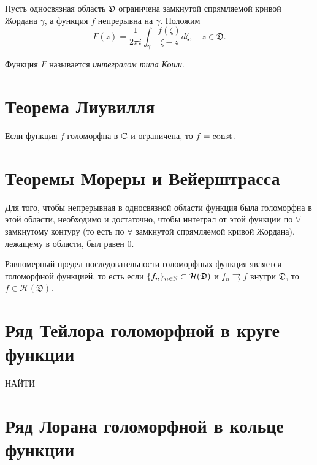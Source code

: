 \begin{definition}
  Пусть односвязная область $\mathfrak{D}$ ограничена замкнутой спрямляемой кривой Жордана $\gamma$, а функция $f$ непрерывна на $\gamma$. Положим
  \[
    F(z) = \frac{1}{2\pi i}\int_{\gamma}\frac{f(\zeta)}{\zeta - z}d \zeta, \quad z \in \mathfrak{D}.
  \]

  Функция $F$ называется \emph{интегралом типа Коши}.
\end{definition}

\section{Теорема Лиувилля}

\begin{theorem}
  Если функция $f$ голоморфна в $\mathbb{C}$ и ограничена, то $f = \operatorname{const}$.
\end{theorem}

\section{Теоремы Мореры и Вейерштрасса}

\begin{theorem}[Морера]
  Для того, чтобы непрерывная в односвязной области функция была голоморфна в этой области, необходимо и достаточно, чтобы интеграл от этой функции по $\forall $ замкнутому контуру (то есть по $\forall $ замкнутой спрямляемой кривой Жордана), лежащему в области, был равен $0$.
\end{theorem}

\begin{theorem}[Вейерштрасса]
  Равномерный предел последовательности голоморфных функция является голоморфной функцией, то есть если $\{f_n\}_{n \in \mathbb{N}}\subset \mathcal{H}(\mathfrak{D})$ и $f_n \rightrightarrows f$ внутри $\mathfrak{D}$, то $f \in \mathcal{H}(\mathfrak{D})$.
\end{theorem}

\section{Ряд Тейлора голоморфной в круге функции}

 {\huge НАЙТИ}

\section{Ряд Лорана голоморфной в кольце функции}


